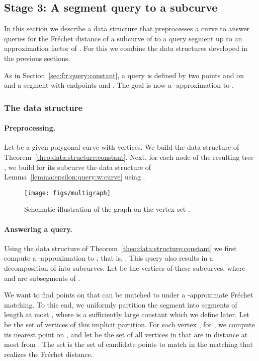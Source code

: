 \documentclass[12pt]{article}
\newcommand{\seclab}[1]{\label{sec:#1}}
\newcommand{\secref}[1]{Section~\ref{sec:#1}}
\newcommand{\thmref}[1]{Theorem~\ref{theo:#1}}
\newcommand{\lemref}[1]{Lemma~\ref{lemma:#1}}
\newcommand{\figlab}[1]{\label{fig:#1}}
\newcommand{\Frechet}{Fr\'{e}c{h}e{}t\xspace}\providecommand{\Arr}{\mathop{\mathrm{\EuScript{A}}}}
\numberwithin{figure}{section}
\numberwithin{equation}{section}
\newcommand{\matching}{matching\xspace}
\begin{document}
\subsection{Stage 3: A segment query to a subcurve}
\seclab{queries:prelim}\seclab{queries:stage:three}\seclab{f:r:query}

In this section we describe a data structure that preprocesses a curve
 to answer queries for the \Frechet distance of a subcurve of
 to a query segment up to an approximation factor of
. For this we combine the data structures developed in the
previous sections.

As in \secref{f:r:query:constant}, a query is defined by two points
 and  on  and a segment with endpoints  and
. The goal is now a -approximation to .

\subsubsection{The data structure}

\paragraph{Preprocessing.}
Let  be a given polygonal curve with  vertices. We build the
data structure of \thmref{data:structure:constant}. Next, for each
node of the resulting tree , we build for its subcurve the data
structure of \lemref{epsilon:query:w:curve} using .

\begin{figure}\centering
    \texttt{[image: figs/multigraph]}
    \caption{Schematic illustration of the graph  on the
       vertex set .}
    \figlab{vi:graph}
\end{figure}


\paragraph{Answering a query.}
Using the data structure of \thmref{data:structure:constant} we first
compute a -approximation  to ; that is, .  This query also
results in a decomposition of  into 
subcurves. Let  be the vertices
of these subcurves, where  and  are subsegments of
.

We want to find points on  that can be matched to
 under a -approximate \Frechet matching.
To this end, we uniformly partition the segment  into
segments of length at most {, where  is a
   sufficiently large constant which we define later.}  Let  be
the set of vertices of this implicit partition.  For each vertex
, for , we compute its nearest point on , and let  be the set of all vertices in
 that are in distance at most  from .  The set  is
the set of candidate points to match  in the \matching{} that
realizes the \Frechet distance.
\end{document}
